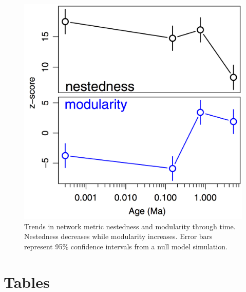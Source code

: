 \begin{figure}[!hp] 
  \centering
  \includegraphics[scale=0.4]{figs/fig_netMets.pdf}
  \caption[Patterns in degree distributions across sites]{Trends in
    network metric nestedness and modularity through time. Nestedness
    decreases while modularity increases. Error bars represent 95\%
    confidence intervals from a null model simulation.}
\label{fig:netMet}
\end{figure}

\clearpage

\section*{Tables}



